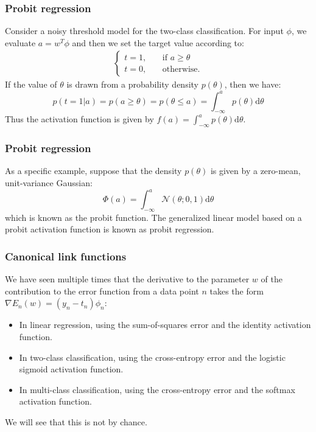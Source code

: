 \documentclass{beamer}
\begin{document}
\begin{frame}
    \frametitle{Probit regression}
    Consider a noisy threshold model for the two-class classification. For input $\phi$, we evaluate $a=w^{T}\phi$ and then we set the target value according to:
    \begin{align*}
        \begin{cases}
            t=1\textrm{,}\qquad\textrm{if }a\ge\theta \\
            t=0\textrm{,}\qquad\textrm{otherwise.}
        \end{cases}
    \end{align*}
    If the value of $\theta$ is drawn from a probability density $p(\theta)$, then we have:
    \begin{equation*}
        p(t=1|a)=p(a\ge\theta)=p(\theta\le{}a)=\int_{-\infty}^{a}p(\theta)\mathrm{d}\theta
    \end{equation*}
    Thus the activation function is given by $f(a)=\int_{-\infty}^{a}p(\theta)\mathrm{d}\theta$.
\end{frame}

\begin{frame}
    \frametitle{Probit regression}
    As a specific example, suppose that the density $p(\theta)$ is given by a zero-mean, unit-variance Gaussian:
    \begin{equation*}
        \Phi(a)=\int_{-\infty}^{a}\mathcal{N}(\theta;0,1)\mathrm{d}\theta
    \end{equation*}
    which is known as the probit function. The generalized linear model based on a probit activation function is known as probit regression.
\end{frame}

\begin{frame}
    \frametitle{Canonical link functions}
    We have seen multiple times that the derivative to the parameter $w$ of the contribution to the error function from a data point $n$ takes the form $\nabla{}E_{n}(w)=(y_{n}-t_{n})\phi_{n}$:
    \begin{itemize}
        \item In linear regression, using the sum-of-squares error and the identity activation function.
        \item In two-class classification, using the cross-entropy error and the logistic sigmoid activation function.
        \item In multi-class classification, using the cross-entropy error and the softmax activation function.
    \end{itemize}
    We will see that this is not by chance.
\end{frame}
\end{document}
